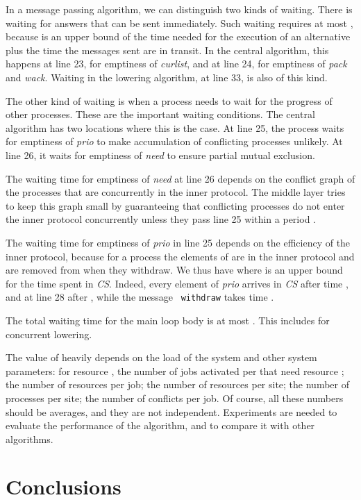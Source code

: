 \documentclass[10pt]{article} \usepackage[english]{babel}
\def\S #1/{\mbox {\textsl{#1}}}
\def\T #1/{\mbox {\texttt{#1}}}
\begin{document}
In a message passing algorithm, we can distinguish two kinds of
waiting.  There is waiting for answers that can be sent immediately.
Such waiting requires at most , because  is an upper
bound of the time needed for the execution of an alternative plus the
time the messages sent are in transit.  In the central algorithm, this
happens at line 23, for emptiness of \S curlist/, and at line 24, for
emptiness of \S pack/ and \S wack/.  Waiting in the lowering
algorithm, at line 33, is also of this kind.

The other kind of waiting is when a process needs to wait for the
progress of other processes.  These are the important waiting
conditions.  The central algorithm has two locations where this is the
case.  At line 25, the process waits for emptiness of \S prio/ to make
accumulation of conflicting processes unlikely.  At line 26, it waits
for emptiness of \S need/ to ensure partial mutual exclusion.

The waiting time  for emptiness of \S need/ at line 26 depends on
the conflict graph of the processes that are concurrently in the inner
protocol. The middle layer tries to keep this graph small by
guaranteeing that conflicting processes do not enter the inner
protocol concurrently unless they pass line 25 within a period
.


The waiting time  for emptiness of \S prio/ in line 25 depends on
the efficiency of the inner protocol, because for a process  the
elements of  are in the inner protocol and are removed
from  when they withdraw.  We thus have  where  is an upper bound for the time spent
in \S CS/.  Indeed, every element of \S prio/ arrives in \S CS/ after
time , and at line 28 after , while the message \T
withdraw/ takes time .  

The total waiting time for the main loop body is at most .  This includes
 for concurrent lowering.

The value of  heavily depends on the load of the system
and other system parameters: for resource , the number of jobs
activated per  that need resource ; the number of resources
per job; the number of resources per site; the number of processes per
site; the number of conflicts per job.  Of course, all these numbers
should be averages, and they are not independent.  Experiments are
needed to evaluate the performance of the algorithm, and to compare it
with other algorithms.

\section{Conclusions} \label{conclusion}
\end{document}
